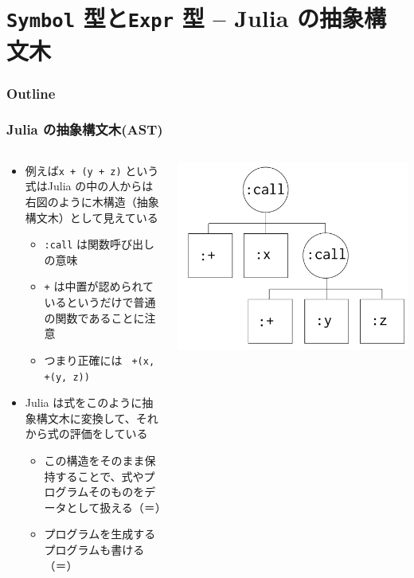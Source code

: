 \section{\texttt{Symbol} 型と\texttt{Expr} 型 -- Julia の抽象構文木}
\begin{frame}
  \frametitle{Outline}
  \tableofcontents[currentsection]
\end{frame}

\begin{frame}[containsverbatim]
\frametitle{Julia の抽象構文木(AST)}
\begin{columns}
\begin{column}{.65\linewidth}
  \begin{itemize}
    \item 例えば\verb|x + (y + z)| という式はJulia の中の人からは右図のように木構造（抽象構文木）として見えている
      \begin{itemize}
        \item \verb|:call| は関数呼び出しの意味
        \item \verb|+| は中置が認められているというだけで普通の関数であることに注意
        \item つまり正確には \verb| +(x, +(y, z))|
      \end{itemize}
  \item Julia は式をこのように抽象構文木に変換して、それから式の評価をしている
    \begin{itemize}
      \item この構造をそのまま保持することで、式やプログラムそのものをデータとして扱える（＝）
      \item プログラムを生成するプログラムも書ける（＝）
    \end{itemize}
  \end{itemize}
\end{column}
\begin{column}{.55\linewidth}
\includegraphics[width=.8\linewidth]{ast.pdf}
\end{column}
\end{columns}
\end{frame}

